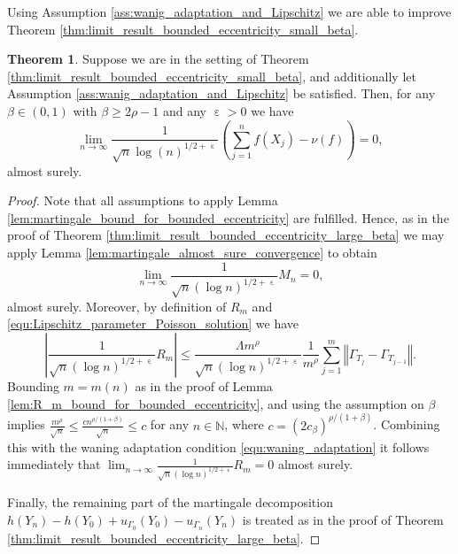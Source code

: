 \documentclass[12pt]{article}
\theoremstyle{definition}
\newtheorem{thm}{Theorem}[section]
\newcommand{\norm}[1]{\left\Vert #1 \right\Vert}
\newcommand{\N}{\mathbb{N}}
\DeclareMathOperator{\eps}{\varepsilon}
\begin{document}
	Using Assumption \ref{ass:wanig_adaptation_and_Lipschitz} we are able to improve Theorem \ref{thm:limit_result_bounded_eccentricity_small_beta}.
	\begin{thm}\label{thm:small_beta_waning_adaptation}
		Suppose we are in the setting of Theorem \ref{thm:limit_result_bounded_eccentricity_small_beta}, 
		and additionally let Assumption \ref{ass:wanig_adaptation_and_Lipschitz} be satisfied.
		Then, for any $\beta \in (0,1)$ with $\beta \geq 2\rho -1$ and any $\eps>0$ we have 
		\[
		\lim_{n \to \infty} \frac{1}{\sqrt{n}\log(n)^{1/2+\eps}} \left( \sum_{j=1}^n f(X_j) - \nu(f)\right) =0, 
		\]
		almost surely. 
	\end{thm}
	
	\begin{proof}
		Note that all assumptions to apply Lemma \ref{lem:martingale_bound_for_bounded_eccentricity} are fulfilled. 
		Hence, as in the proof of Theorem \ref{thm:limit_result_bounded_eccentricity_large_beta} we may apply Lemma \ref{lem:martingale_almost_sure_convergence} to obtain 
		\[
		\lim_{n \to \infty}
		\frac{1}{\sqrt{n}(\log n)^{1/2+\eps}} M_n =0,
		\]
		almost surely. Moreover, by definition of $R_m$ and \eqref{equ:Lipschitz_parameter_Poisson_solution} we have 
		\[
		\left\vert \frac{1}{\sqrt{n}(\log n)^{1/2+\eps}} R_m \right\vert \leq  \frac{\Lambda m^\rho}{\sqrt{n}(\log n)^{1/2+\eps}} \frac{1}{m^\rho}\sum_{j=1}^m \norm{\Gamma_{T_j}-\Gamma_{T_{j-1}}}  .
		\]
		Bounding $m=m(n)$ as in the proof of Lemma \ref{lem:R_m_bound_for_bounded_eccentricity}, and using the assumption on $\beta$ implies $\frac{m^\rho}{\sqrt{n}} \leq \frac{c n^{\rho/(1+\beta)}}{\sqrt{n}} \leq c$ for any $n \in \N$, where $c= (2c_\beta)^{\rho/(1+\beta)}$. 
		Combining this with the waning adaptation condition \eqref{equ:waning_adaptation} it follows immediately that $\lim_{n \to \infty}\frac{1}{\sqrt{n}(\log n)^{1/2+\eps}} R_m =0$ almost surely. 
		
		Finally, the remaining part of the martingale decomposition $h(Y_n) - h(Y_0) 
		+{u}_{\Gamma_0}(Y_0) - {u}_{\Gamma_{n}}(Y_n)$ is treated as in the proof of Theorem \ref{thm:limit_result_bounded_eccentricity_large_beta}.
	\end{proof}
\end{document}
